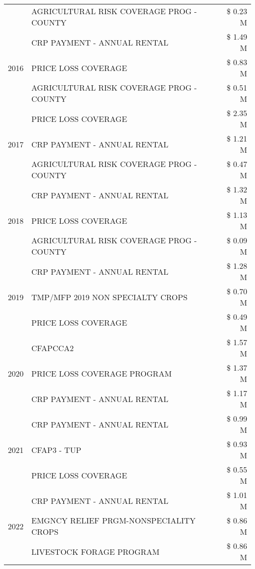 \begin{tabular}{llr}
 & AGRICULTURAL RISK COVERAGE PROG - COUNTY & \$ 0.23 M \\
\cline{1-3}
\multirow[t]{3}{*}{2016} & CRP PAYMENT - ANNUAL RENTAL & \$ 1.49 M \\
 & PRICE LOSS COVERAGE & \$ 0.83 M \\
 & AGRICULTURAL RISK COVERAGE PROG - COUNTY & \$ 0.51 M \\
\cline{1-3}
\multirow[t]{3}{*}{2017} & PRICE LOSS COVERAGE & \$ 2.35 M \\
 & CRP PAYMENT - ANNUAL RENTAL & \$ 1.21 M \\
 & AGRICULTURAL RISK COVERAGE PROG - COUNTY & \$ 0.47 M \\
\cline{1-3}
\multirow[t]{3}{*}{2018} & CRP PAYMENT - ANNUAL RENTAL & \$ 1.32 M \\
 & PRICE LOSS COVERAGE & \$ 1.13 M \\
 & AGRICULTURAL RISK COVERAGE PROG - COUNTY & \$ 0.09 M \\
\cline{1-3}
\multirow[t]{3}{*}{2019} & CRP PAYMENT - ANNUAL RENTAL & \$ 1.28 M \\
 & TMP/MFP 2019 NON SPECIALTY CROPS & \$ 0.70 M \\
 & PRICE LOSS COVERAGE & \$ 0.49 M \\
\cline{1-3}
\multirow[t]{3}{*}{2020} & CFAPCCA2 & \$ 1.57 M \\
 & PRICE LOSS COVERAGE PROGRAM & \$ 1.37 M \\
 & CRP PAYMENT - ANNUAL RENTAL & \$ 1.17 M \\
\cline{1-3}
\multirow[t]{3}{*}{2021} & CRP PAYMENT - ANNUAL RENTAL & \$ 0.99 M \\
 & CFAP3 - TUP & \$ 0.93 M \\
 & PRICE LOSS COVERAGE & \$ 0.55 M \\
\cline{1-3}
\multirow[t]{3}{*}{2022} & CRP PAYMENT - ANNUAL RENTAL & \$ 1.01 M \\
 & EMGNCY RELIEF PRGM-NONSPECIALITY CROPS & \$ 0.86 M \\
 & LIVESTOCK FORAGE PROGRAM & \$ 0.86 M \\
\cline{1-3}
\bottomrule
\end{tabular}
